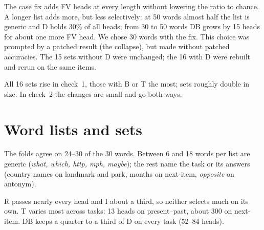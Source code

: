 \documentclass[10pt,a4paper]{article}
\begin{document}
The case fix adds FV heads at every length without lowering the ratio to chance. A longer list adds more, but less selectively: at 50 words almost half the list is generic and D holds 30\% of all heads; from 30 to 50 words DB grows by 15 heads for about one more FV head. We chose 30 words with the fix. This choice was prompted by a patched result (the collapse), but made without patched accuracies. The 15 sets without D were unchanged; the 16 with D were rebuilt and rerun on the same items.

\begin{table}[H]\centering\small

\caption{Every set with D, first run (10 words, Yang's expansion) and now (30 words, with the fix): heads (median over tasks), task accuracy at the cross-fitted $\alpha$, mean over tasks.}
\label{tab:firstrun}
\end{table}

All 16 sets rise in check~1, those with B or T the most; sets roughly double in size. In check~2 the changes are small and go both ways.

\section{Word lists and sets}

\begin{table}[H]\centering\scriptsize

\caption{D's word lists, fold 1; last column: words also on fold 2's list.}
\label{tab:lists}
\end{table}

The folds agree on 24--30 of the 30 words. Between 6 and 18 words per list are generic (\emph{what, which, http, mph, maybe}); the rest name the task or its answers (country names on landmark and park, months on next-item, \emph{opposite} on antonym).

\begin{table}[H]\centering\small
\resizebox{\linewidth}{!}{}
\caption{Heads per set, mean of the two folds (1{,}024 heads in all). D (1st), DB (1st): the first run's D and DB.}
\label{tab:sizes}
\end{table}

R passes nearly every head and I about a third, so neither selects much on its own. T varies most across tasks: 13 heads on present--past, about 300 on next-item. DB keeps a quarter to a third of D on every task (52--84 heads).
\end{document}
